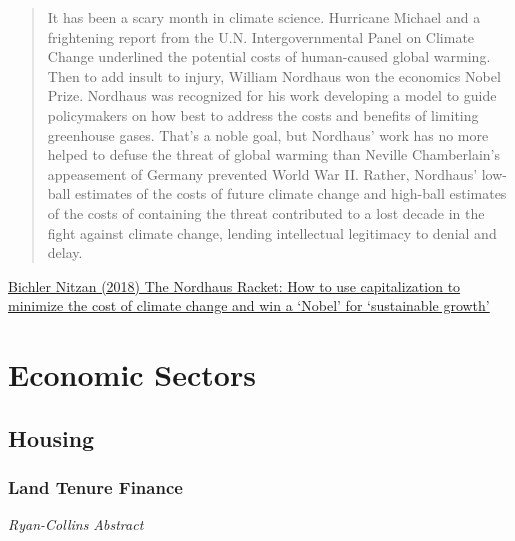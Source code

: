 \documentclass[
]{book}
\begin{document}
\begin{quote}
It has been a scary month in climate science. Hurricane Michael and a frightening report from the U.N. Intergovernmental Panel on Climate Change underlined the potential costs of human-caused global warming. Then to add insult to injury, William Nordhaus won the economics Nobel Prize.
Nordhaus was recognized for his work developing a model to guide policymakers on how best to address the costs and benefits of limiting greenhouse gases. That's a noble goal, but Nordhaus' work has no more helped to defuse the threat of global warming than Neville Chamberlain's appeasement of Germany prevented World War II. Rather, Nordhaus' low-ball estimates of the costs of future climate change and high-ball estimates of the costs of containing the threat contributed to a lost decade in the fight against climate change, lending intellectual legitimacy to denial and delay.
\end{quote}

\href{https://rwer.wordpress.com/2018/11/05/the-nordhaus-racket-how-to-use-capitalization-to-minimize-the-cost-of-climate-change-and-win-a-nobel-for-sustainable-growth/}{Bichler Nitzan (2018) The Nordhaus Racket: How to use capitalization to minimize the cost of climate change and win a `Nobel' for `sustainable growth'}

\hypertarget{economic-sectors}{%
\chapter{Economic Sectors}\label{economic-sectors}}

\hypertarget{housing}{%
\section{Housing}\label{housing}}

\hypertarget{land-tenure-finance}{%
\subsection{Land Tenure Finance}\label{land-tenure-finance}}

\emph{Ryan-Collins Abstract}
\end{document}
